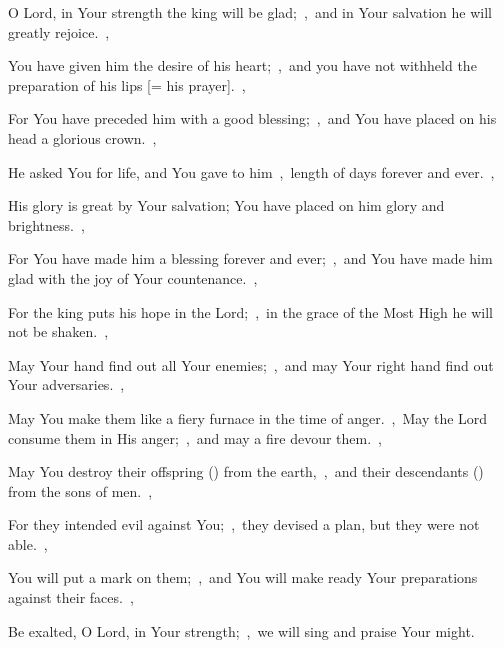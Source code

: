 \documentclass[12pt,twoside,a5paper]{article}
\begin{document}
\begin{normalparskip}
  O Lord, in Your strength the king will be glad;~\sep\ and in Your salvation he will greatly rejoice.~\sep


  You have given him the desire of his heart;~\sep\ and you have not withheld the preparation of his lips [= his prayer].~\sep

  For You have preceded him with a good blessing;~\sep\ and You have placed on his head a glorious crown.~\sep

  He asked You for life, and You gave to him~\sep\ length of days forever and ever.~\sep

  His glory is great by Your salvation; You have placed on him glory and brightness.~\sep

  For You have made him a blessing forever and ever;~\sep\ and You have made him glad with the joy of Your countenance.~\sep

  For the king puts his hope in the Lord;~\sep\ in the grace of the Most High he will not be shaken.~\sep

  May Your hand find out all Your enemies;~\sep\ and may Your right hand find out Your adversaries.~\sep

  May You make them like a fiery furnace in the time of anger.~\sep\ May the Lord consume them in His anger;~\sep\ and may a fire devour them.~\sep

  May You destroy their offspring () from the earth,~\sep\ and their descendants () from the sons of men.~\sep

  For they intended evil against You;~\sep\ they devised a plan, but they were not able.~\sep

  You will put a mark on them;~\sep\ and You will make ready Your preparations against their faces.~\sep

  Be exalted, O Lord, in Your strength;~\sep\ we will sing and praise Your might.
\end{normalparskip}



\end{document}
